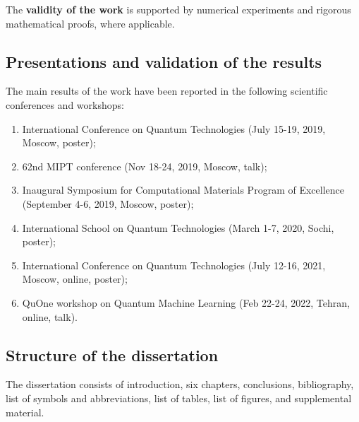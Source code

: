 The \textbf{validity of the work} is supported by numerical experiments and rigorous mathematical proofs, where applicable.

\subsection*{Presentations and validation of the results}
The main results of the work have been reported in the following scientific conferences and workshops:

\begin{enumerate}
    \item International Conference on Quantum Technologies (July 15-19, 2019, Moscow, poster);
    \item 62nd MIPT conference (Nov 18-24, 2019, Moscow, talk);
    \item Inaugural Symposium for Computational Materials Program of Excellence (September 4-6, 2019, Moscow, poster);
    \item International School on Quantum Technologies (March 1-7, 2020, Sochi, poster);
    \item International Conference on Quantum Technologies (July 12-16, 2021, Moscow, online, poster);
    \item QuOne workshop on Quantum Machine Learning (Feb 22-24, 2022, Tehran, online, talk).
\end{enumerate}

\subsection*{Structure of the dissertation} The dissertation consists of introduction, six chapters, conclusions, bibliography, list of symbols and abbreviations, list of tables, list of figures, and supplemental material.
